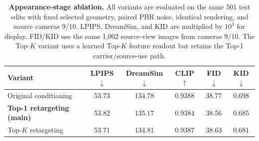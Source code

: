\providecommand{\gearAblBest}[1]{\colorbox{gearAblBest}{#1}}
\providecommand{\gearAblSecond}[1]{\colorbox{gearAblSecond}{#1}}

\begin{table}[t]
\centering
\caption{\small
\textbf{Appearance-stage ablation.}
All variants are evaluated on the same 501 test edits with fixed selected
geometry, paired PBR noise, identical rendering, and source cameras 9/10.
LPIPS, DreamSim, and KID are multiplied by $10^3$ for display. FID/KID use
the same 1,002 source-view images from cameras 9/10. The Top-$K$ variant
uses a learned Top-$K$ feature readout but retains the Top-1
carrier/source-use path.
}
\label{tab:appearance_ablation}
\begingroup
\footnotesize
\setlength{\tabcolsep}{3.2pt}
\setlength{\fboxsep}{0.9pt}
\renewcommand{\arraystretch}{1.12}
\begin{tabular}{@{}lccccc@{}}
\toprule
\textbf{Variant} & \textbf{LPIPS}$\downarrow$ & \textbf{DreamSim}$\downarrow$ & \textbf{CLIP}$\uparrow$ & \textbf{FID}$\downarrow$ & \textbf{KID}$\downarrow$ \\
\midrule
Original conditioning & \gearAblSecond{53.73} & \gearAblBest{134.78} & \gearAblBest{0.9388} & 38.77 & 0.698 \\
\textbf{Top-1 retargeting (main)} & 53.82 & 135.17 & 0.9384 & \gearAblBest{38.56} & \gearAblSecond{0.685} \\
Top-$K$ retargeting & \gearAblBest{53.71} & \gearAblSecond{134.81} & \gearAblSecond{0.9387} & \gearAblSecond{38.63} & \gearAblBest{0.681} \\
\bottomrule
\end{tabular}
\endgroup
\end{table}
